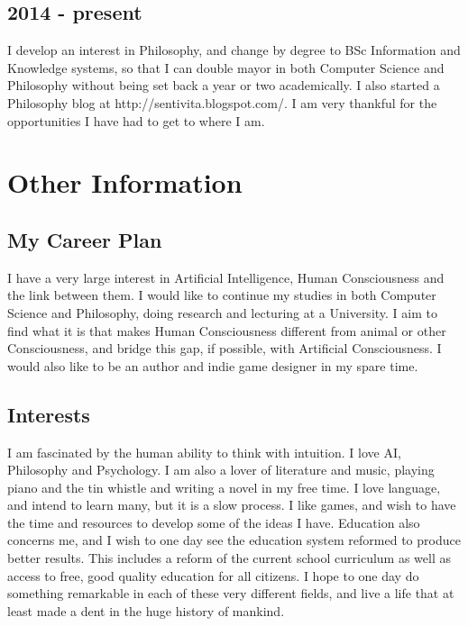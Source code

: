 \documentclass[a4paper]{article}
\begin{document}
	\subsection*{2014 - present}
		I develop an interest in Philosophy, and change by degree to BSc Information and Knowledge systems, so that I can double mayor in both Computer Science and Philosophy without being set back a year or two academically. I also started a Philosophy blog at http://sentivita.blogspot.com/. I am very thankful for the opportunities I have had to get to where I am.

\section*{Other Information}

	\subsection*{My Career Plan}

	 I have a very large interest in Artificial Intelligence, Human Consciousness and the link between them. I would like to continue my studies in both Computer Science and Philosophy, doing research and lecturing at a University. I aim to find what it is that makes Human Consciousness different from animal or other Consciousness, and bridge this gap, if possible, with Artificial Consciousness. I would also like to be an author and indie game designer in my spare time.

	\subsection*{Interests}

	I am fascinated by the human ability to think with intuition. I love AI, Philosophy and Psychology. I am also a lover of literature and music, playing piano and the tin whistle and writing a novel in my free time. I love language, and intend to learn many, but it is a slow process. I like games, and wish to have the time and resources to develop some of the ideas I have. Education also concerns me, and I wish to one day see the education system reformed to produce better results. This includes a reform of the current school curriculum as well as access to free, good quality education for all citizens. I hope to one day do something remarkable in each of these very different fields, and live a life that at least made a dent in the huge history of mankind.
\end{document}
